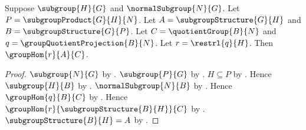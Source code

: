 \begin{theorem}\label{group_second_isomorphism_restriction_hom}
    Suppose $\subgroup{H}{G}$ and $\normalSubgroup{N}{G}$.
    Let $P=\subgroupProduct{G}{H}{N}$.
    Let $A=\subgroupStructure{G}{H}$ and
        $B=\subgroupStructure{G}{P}$.
    Let $C=\quotientGroup{B}{N}$ and
        $q=\groupQuotientProjection{B}{N}$.
    Let $r=\restrl{q}{H}$.
    Then $\groupHom{r}{A}{C}$.
\end{theorem}
\begin{proof}
    $\subgroup{N}{G}$ by .
    $\subgroup{P}{G}$ by .
    $H\subseteq P$ by .
    Hence $\subgroup{H}{B}$ by
        .
    $\normalSubgroup{N}{B}$ by
        .
    Hence $\groupHom{q}{B}{C}$ by
        .
    Hence
        $\groupHom{r}{\subgroupStructure{B}{H}}{C}$ by
        .
    $\subgroupStructure{B}{H}=A$ by
        .
\end{proof}

